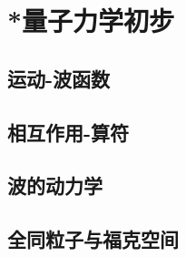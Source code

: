 

\section{*量子力学初步}\label{29-3}

\subsection{运动-波函数}\label{29-3-1}

\subsection{相互作用-算符}\label{29-3-2}

\subsection{波的动力学}\label{29-3-3}

\subsection{全同粒子与福克空间}\label{29-3-4}
